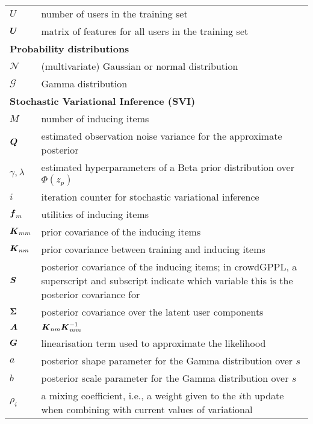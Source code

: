 \begin{table}
\begin{tabularx}{\columnwidth}{p{1.7cm} X }
 $U$ & number of users in the training set \\
 $\boldsymbol U$ & matrix of features for all users in the training set \\ 
 \multicolumn{2}{l}{\textbf{Probability distributions}} \\
 $\mathcal{N}$ & (multivariate) Gaussian or normal distribution \\
 $\mathcal{G}$ & Gamma distribution \\
 \multicolumn{2}{l}{\textbf{Stochastic Variational Inference (SVI) }} \\
 $M$ & number of inducing items \\
 $\boldsymbol Q$ & estimated observation noise variance for the approximate posterior \\
 $\gamma, \lambda$ & estimated hyperparameters of a Beta prior distribution over $\Phi(z_p)$ \\
 $i$ & iteration counter for stochastic variational inference \\
 $\boldsymbol f_m$ & utilities of inducing items \\
 $\boldsymbol K_{mm}$ & prior covariance of the inducing items \\
 $\boldsymbol K_{nm}$ & prior covariance between training and inducing items \\
 $\boldsymbol S$ & posterior covariance of the inducing items; in crowdGPPL, a superscript and subscript 
 indicate which variable this is the posterior covariance for \\
 $\boldsymbol \Sigma$ & posterior covariance over the latent user components \\
 $\boldsymbol A$ & $\boldsymbol K_{nm} \boldsymbol K_{mm}^{-1}$ \\
 $\boldsymbol G$ & linearisation term used to approximate the likelihood \\
 $a$ & posterior shape parameter for the Gamma distribution over $s$ \\
 $b$ & posterior scale parameter for the Gamma distribution over $s$ \\
 $\rho_i$ & a mixing coefficient, i.e., a weight given to the $i$th update when combining with current values of variational

\end{tabularx}
\end{table}
